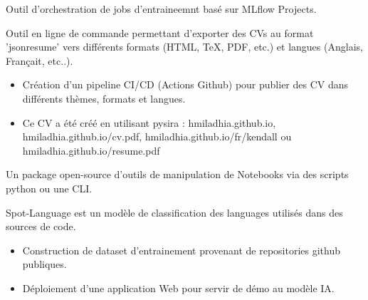 \documentclass[10pt,letter,ragged2e,withhyper]{altacv}
\renewcommand{\divider}{\textcolor{body!30}{\hdashrule{\linewidth}{0.6pt}{0.5ex}}\medskip}
\begin{document}
\begin{paracol}{2}

Outil d'orchestration de jobs d'entraineemnt basé sur MLflow Projects.


\divider
{}

Outil en ligne de commande permettant d'exporter des CVs au format 'jsonresume' vers différents formats (HTML, TeX, PDF, etc.) et langues (Anglais, Françait, etc..).

\begin{itemize}
      \item Création d'un pipeline CI/CD (Actions Github) pour publier des CV dans différents thèmes, formats et langues.
      \item Ce CV a été créé en utilisant pysira : hmiladhia.github.io, hmiladhia.github.io/cv.pdf, hmiladhia.github.io/fr/kendall ou hmiladhia.github.io/resume.pdf
  \end{itemize}

\divider
{}

Un package open-source d'outils de manipulation de Notebooks via des scripts python ou une CLI.


\divider
{}

Spot-Language est un modèle de classification des languages utilisés dans des sources de code.

\begin{itemize}
      \item Construction de dataset d'entrainement provenant de repositories github publiques.
      \item Déploiement d'une application Web pour servir de démo au modèle IA.
  \end{itemize}




\end{paracol}
\end{document}

